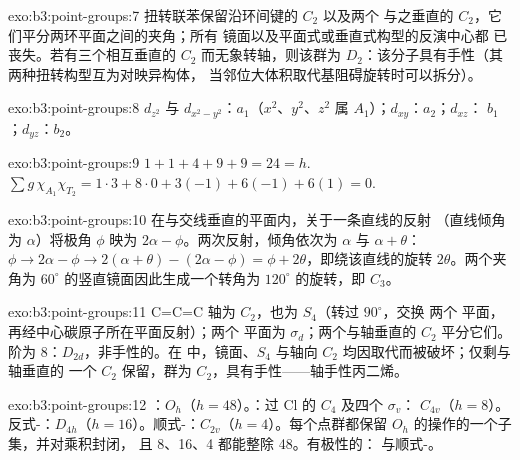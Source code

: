 \begin{solution}{exo:b3:point-groups:7}
扭转联苯保留沿环间键的 $C_2$ 以及两个
与之垂直的 $C_2$，它们平分两环平面之间的夹角；所有
镜面以及平面式或垂直式构型的反演中心都
已丧失。若有三个相互垂直的 $C_2$ 而无象转轴，则该群为
$D_2$：该分子具有手性（其两种扭转构型互为对映异构体，
当邻位大体积取代基阻碍旋转时可以拆分）。
\end{solution}

\begin{solution}{exo:b3:point-groups:8}
$d_{z^2}$ 与 $d_{x^2-y^2}$：$a_1$（$x^2$、$y^2$、$z^2$ 属 $A_1$）；$d_{xy}$：$a_2$；$d_{xz}$：
$b_1$；$d_{yz}$：$b_2$。
\end{solution}

\begin{solution}{exo:b3:point-groups:9}
$1 + 1 + 4 + 9 + 9 = 24 = h$. $\sum g\,\chi_{A_1}\chi_{T_2} = 1\cdot3 + 8\cdot0 + 3(-1)
+ 6(-1) + 6(1) = 0$.
\end{solution}

\begin{solution}{exo:b3:point-groups:10}
在与交线垂直的平面内，关于一条直线的反射
（直线倾角为 $\alpha$）将极角 $\phi$ 映为 $2\alpha - \phi$。两次反射，倾角依次为
$\alpha$ 与 $\alpha + \theta$：$\phi \to 2\alpha - \phi \to 2(\alpha + \theta) - (2\alpha - \phi) =
\phi + 2\theta$，即绕该直线的旋转 $2\theta$。两个夹角为
$60^\circ$ 的竖直镜面因此生成一个转角为 $120^\circ$ 的旋转，即 $C_3$。
\end{solution}

\begin{solution}{exo:b3:point-groups:11}
C=C=C 轴为 $C_2$，也为 $S_4$（转过 $90^\circ$，交换
两个  平面，再经中心碳原子所在平面反射）；两个
 平面为 $\sigma_d$；两个与轴垂直的 $C_2$ 平分它们。
阶为 8：$D_{2d}$，非手性的。在  中，镜面、$S_4$ 与轴向
$C_2$ 均因取代而被破坏；仅剩与轴垂直的
一个 $C_2$ 保留，群为 $C_2$，具有手性——轴手性丙二烯。
\end{solution}

\begin{solution}{exo:b3:point-groups:12}
：$O_h$（$h = 48$）。：过 Cl 的 $C_4$ 及四个 $\sigma_v$：
$C_{4v}$（$h = 8$）。反式-：$D_{4h}$（$h = 16$）。顺式-：$C_{2v}$（$h
= 4$）。每个点群都保留 $O_h$ 的操作的一个子集，并对乘积封闭，
且 8、16、4 都能整除 48。有极性的： 与顺式-。
\end{solution}

